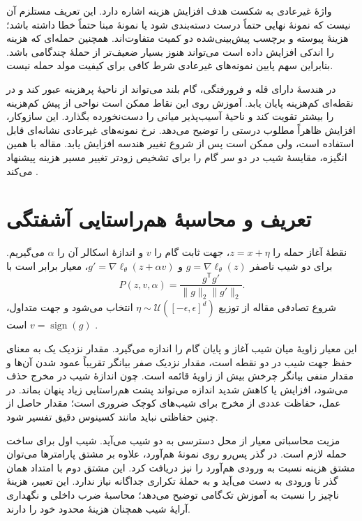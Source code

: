 واژهٔ غیرعادی به شکست هدف افزایش هزینه اشاره دارد. این تعریف مستلزم آن نیست که نمونهٔ نهایی حتماً درست دسته‌بندی شود یا نمونهٔ مبنا حتماً خطا داشته باشد؛ هزینهٔ پیوسته و برچسب پیش‌بینی‌شده دو کمیت متفاوت‌اند. همچنین حمله‌ای که هزینه را اندکی افزایش داده است می‌تواند هنوز بسیار ضعیف‌تر از حملهٔ چندگامی باشد. بنابراین سهم پایین نمونه‌های غیرعادی شرط کافی برای کیفیت مولد حمله نیست.

در هندسهٔ دارای قله و فرورفتگی، گام بلند می‌تواند از ناحیهٔ پرهزینه عبور کند و در نقطه‌ای کم‌هزینه پایان یابد. آموزش روی این نقاط ممکن است نواحی از پیش کم‌هزینه را بیشتر تقویت کند و ناحیهٔ آسیب‌پذیر میانی را دست‌نخورده بگذارد. این سازوکار، افزایش ظاهراً مطلوب درستی  را توضیح می‌دهد. نرخ نمونه‌های غیرعادی نشانه‌ای قابل استفاده است، ولی ممکن است پس از شروع تغییر هندسه افزایش یابد. مقاله با همین انگیزه، مقایسهٔ شیب در دو سر گام را برای تشخیص زودتر تغییر مسیر هزینه پیشنهاد می‌کند \cite{sora2026}.

\section{تعریف و محاسبهٔ هم‌راستایی آشفتگی}
\label{sec:geometry-pertalign}

\begin{تعریف}
نقطهٔ آغاز حمله را $z=x+\eta$، جهت ثابت گام را $v$ و اندازهٔ اسکالر آن را $\alpha$ می‌گیریم. برای دو شیب ناصفر $g=\nabla\ell_\theta(z)$ و $g'=\nabla\ell_\theta(z+\alpha v)$، معیار \pertalign{} برابر است با
\begin{equation}
P(z,v,\alpha)=\frac{g^{\mathsf T}g'}{\|g\|_2\|g'\|_2}.
\label{eq:geometry-pertalign}
\end{equation}
شروع تصادفی مقاله از توزیع $\eta\sim\mathcal{U}([-\epsilon,\epsilon]^d)$ انتخاب می‌شود و جهت متداول، $v=\operatorname{sign}(g)$ است \cite{sora2026}.
\end{تعریف}

این معیار زاویهٔ میان شیب آغاز و پایان گام را اندازه می‌گیرد. مقدار نزدیک یک به معنای حفظ جهت شیب در دو نقطه است، مقدار نزدیک صفر بیانگر تقریباً عمود شدن آن‌ها و مقدار منفی بیانگر چرخش بیش از زاویهٔ قائمه است. چون اندازهٔ شیب در مخرج حذف می‌شود، افزایش یا کاهش شدید اندازه می‌تواند پشت هم‌راستایی زیاد پنهان بماند. در عمل، حفاظت عددی از مخرج برای شیب‌های کوچک ضروری است؛ مقدار حاصل از چنین حفاظتی نباید مانند کسینوس دقیق تفسیر شود.

مزیت محاسباتی معیار از محل دسترسی به دو شیب می‌آید. شیب اول برای ساخت حمله لازم است. در گذر پس‌رو روی نمونهٔ هم‌آورد، علاوه بر مشتق پارامترها می‌توان مشتق هزینه نسبت به ورودی هم‌آورد را نیز دریافت کرد. این مشتق دوم با امتداد همان گذر تا ورودی به دست می‌آید و به حملهٔ تکراری جداگانه نیاز ندارد. این تعبیر، هزینهٔ ناچیز را نسبت به آموزش تک‌گامی توضیح می‌دهد؛ محاسبهٔ ضرب داخلی و نگهداری آرایهٔ شیب همچنان هزینهٔ محدود خود را دارند.


